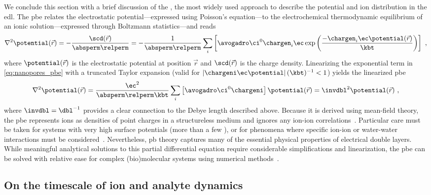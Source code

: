 We conclude this section with a brief discussion of the , the most widely used approach to
describe the potential and ion distribution in the \gls{edl}. The \gls{pbe} relates the electrostatic
potential---expressed using Poisson's equation---to the electrochemical thermodynamic equilibrium of an ionic
solution---expressed through Boltzmann statistics---and reads~\cite{Gouy-1910,Chapman-1913,Baker-2005}
%
\begin{equation}\label{eq:nanopores_pbe}
  \nabla^2 \potential(\vec{r}) = - \dfrac{\scd(\vec{r})}{\absperm \relperm}
  = - \dfrac{1}{\absperm \relperm}
  \sum_i \left[ \avogadro \ci^0 \chargen_i \ec
         \exp \left( \dfrac{-\chargen_i \ec \potential(\vec{r}) }{\kbt} \right)
        \right]
  \text{ ,}
\end{equation}
%
where $\potential(\vec{r})$ is the electrostatic potential at position $\vec{r}$ and $\scd(\vec{r})$ is the
charge density. Linearizing the exponential term in \cref{eq:nanopores_pbe} with a truncated Taylor expansion
(valid for $\left| \chargeni \ec \potential \right| (\kbt)^{-1} < 1$) yields the linearized \gls{pbe}
%
\begin{equation}\label{eq:nanopores_pbe_linear}
  \nabla^2 \potential(\vec{r})
  = \dfrac{\ec^2}{\absperm \relperm \kbt} \sum_i \left[ \avogadro \ci^0 \chargeni \right]
      \potential(\vec{r})
  = \invdbl^2 \potential(\vec{r})
  \text{ ,}
\end{equation}
%
where $\invdbl = \dbl^{-1}$ provides a clear connection to the Debye length described above. Because it is
derived using mean-field theory, the \gls{pbe} represents ions as densities of point charges in a
structureless medium and ignores any ion-ion correlations~\cite{Bocquet-2010}. Particular care must be taken
for systems with very high surface potentials (more than a few \si{\kTe}), or for phenomena where specific
ion-ion or water-water interactions must be considered~\cite{Collins-2012}. Nevertheless, \gls{pb} theory
captures many of the essential physical properties of electrical double layers. While meaningful
analytical solutions to this partial differential equation require considerable simplifications and
linearization, the \gls{pbe} can be solved with relative ease for complex (bio)molecular
systems using numerical methods~\cite{Baker-2001,Baker-2005}.


\subsection{On the timescale of ion and analyte dynamics}
%
\label{sec:np:dynamics}
%

